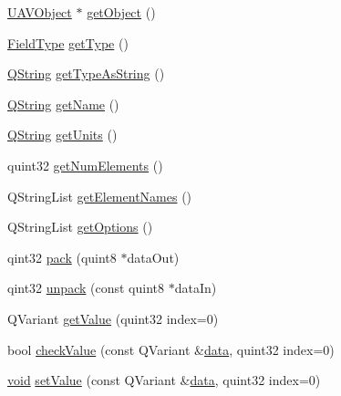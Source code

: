 \begin{DoxyCompactItemize}
\item 
\hyperlink{class_u_a_v_object}{\-U\-A\-V\-Object} $\ast$ \hyperlink{group___u_a_v_objects_plugin_ga9a3e58eb1d96fbb375c9e28f870ae1d3}{get\-Object} ()
\item 
\hyperlink{group___u_a_v_objects_plugin_ga74498368bc91f3ed74beacb096744cf3}{\-Field\-Type} \hyperlink{group___u_a_v_objects_plugin_gad306893ea1f5623eaa970e35ffa7d901}{get\-Type} ()
\item 
\hyperlink{group___u_a_v_objects_plugin_gab9d252f49c333c94a72f97ce3105a32d}{\-Q\-String} \hyperlink{group___u_a_v_objects_plugin_ga53cf1cae78bc619ca91faffedacfc61f}{get\-Type\-As\-String} ()
\item 
\hyperlink{group___u_a_v_objects_plugin_gab9d252f49c333c94a72f97ce3105a32d}{\-Q\-String} \hyperlink{group___u_a_v_objects_plugin_ga86c7c87ecda0ed11b8a2f125b0741bab}{get\-Name} ()
\item 
\hyperlink{group___u_a_v_objects_plugin_gab9d252f49c333c94a72f97ce3105a32d}{\-Q\-String} \hyperlink{group___u_a_v_objects_plugin_gabb1e371d4c3d91f70a172d7827db2da8}{get\-Units} ()
\item 
quint32 \hyperlink{group___u_a_v_objects_plugin_ga6c929356a6e66fd7c56e9d547e67ef7c}{get\-Num\-Elements} ()
\item 
\-Q\-String\-List \hyperlink{group___u_a_v_objects_plugin_ga5686a3cb18234741a84666023acf4e8e}{get\-Element\-Names} ()
\item 
\-Q\-String\-List \hyperlink{group___u_a_v_objects_plugin_ga23e324a921bdf20972f940b4497a2c21}{get\-Options} ()
\item 
qint32 \hyperlink{group___u_a_v_objects_plugin_gabfadd471718e9a6bdb5e106fb99574d9}{pack} (quint8 $\ast$data\-Out)
\item 
qint32 \hyperlink{group___u_a_v_objects_plugin_ga8223d7b605648a98c12d00ae43febd5c}{unpack} (const quint8 $\ast$data\-In)
\item 
\-Q\-Variant \hyperlink{group___u_a_v_objects_plugin_ga60a1c56703ea2c28f76d1eaf05554f5e}{get\-Value} (quint32 index=0)
\item 
bool \hyperlink{group___u_a_v_objects_plugin_ga8aed4e68eb0697d4776a103bfe5aa059}{check\-Value} (const \-Q\-Variant \&\hyperlink{group___u_a_v_objects_plugin_gae6a068d71cfd70f70c7e6fb10f217ca5}{data}, quint32 index=0)
\item 
\hyperlink{group___u_a_v_objects_plugin_ga444cf2ff3f0ecbe028adce838d373f5c}{void} \hyperlink{group___u_a_v_objects_plugin_gab647538e1956252e12841c42a54106c7}{set\-Value} (const \-Q\-Variant \&\hyperlink{group___u_a_v_objects_plugin_gae6a068d71cfd70f70c7e6fb10f217ca5}{data}, quint32 index=0)

\end{DoxyCompactItemize}
